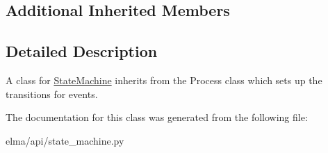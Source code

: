 \subsection*{Additional Inherited Members}


\subsection{Detailed Description}
A class for \hyperlink{classelma_1_1api_1_1state__machine_1_1StateMachine}{State\+Machine} inherits from the Process class which sets up the transitions for events. 



The documentation for this class was generated from the following file\+:\begin{DoxyCompactItemize}
\item 
elma/api/state\+\_\+machine.\+py\end{DoxyCompactItemize}

